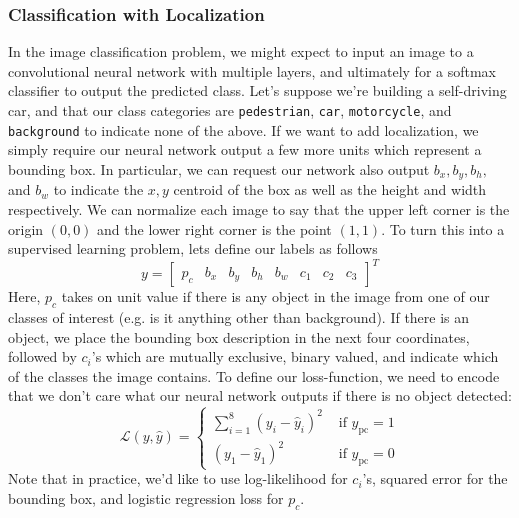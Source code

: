 \documentclass[12pt]{article}
\begin{document}
\subsubsection{Classification with Localization} In the image classification problem, we might expect to input an image to a convolutional neural network with multiple layers, and ultimately for a softmax classifier to output the predicted class. Let's suppose we're building a self-driving car, and that our
class categories are \texttt{pedestrian}, \texttt{car}, \texttt{motorcycle},
and \texttt{background} to indicate none of the above. If we want to add localization, we simply require our neural network output a few more units which represent a bounding box. In particular, we can request our network also output
$b_x, b_y, b_h,$ and $b_w$ to indicate the $x,y$ centroid of the box as well as the height and width respectively. We can normalize each image to say that the upper left corner is the origin $(0,0)$ and the lower right corner is the point
$(1,1)$. To turn this into a supervised learning problem, lets define our labels as follows
\[
y = \begin{bmatrix} p_c & b_x & b_y & b_h & b_w & c_1 & c_2 & c_3 \end{bmatrix}^T
\]
Here, $p_c$ takes on unit value if there is any object in the image from one of our classes of interest (e.g. is it anything other than background). If there is an object, we place the bounding box description in the next four coordinates, followed by $c_i$'s which are mutually exclusive, binary valued, and indicate which of the classes the image contains. To define our loss-function, we need to encode that we don't care what our neural network outputs if there is no object detected:
\begin{equation*}
  \mathcal L (y, \hat y) =
  \begin{cases}
    \sum_{i=1}^8 (y_i - \hat y_i)^2 & \textrm{ if } y_{\textrm{pc}} = 1 \\
    (y_1 - \hat y_1)^2 & \textrm{ if } y_{\textrm{pc}} = 0
  \end{cases}
\end{equation*}
Note that in practice, we'd like to use log-likelihood for $c_i$'s, squared error for the bounding box, and logistic regression loss for $p_c$.
\end{document}
